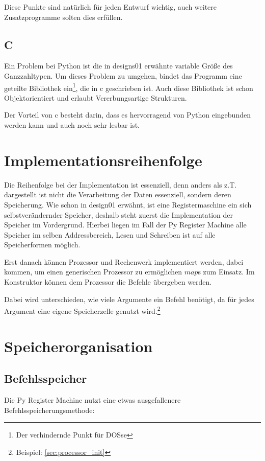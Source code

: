 \documentclass[a4paper,12pt,oneside]{scrreprt}
\begin{document}
Diese Punkte sind natürlich für jeden Entwurf wichtig, auch weitere Zusatzprogramme solten dies erfüllen.

\section{C}

Ein Problem bei Python ist die in designs01 erwähnte variable Größe des Ganzzahltypen. Um dieses Problem zu umgehen, bindet das Programm eine geteilte Bibliothek ein\footnote{Der verhindernde Punkt für DOSse}, die in c geschrieben ist.
Auch diese Bibliothek ist schon Objektorientiert und erlaubt Vererbungsartige Strukturen.

Der Vorteil von c besteht darin, dass es hervorragend von Python eingebunden werden kann und auch noch sehr lesbar ist.

\chapter{Implementationsreihenfolge}

Die Reihenfolge bei der Implementation ist essenziell, denn anders als z.T. dargestellt ist nicht die Verarbeitung der Daten essenziell, sondern deren Speicherung.  
Wie schon in design01 erwähnt, ist eine Registermaschine ein sich selbstverändernder Speicher, deshalb steht zuerst die Implementation der Speicher im Vordergrund.  
Hierbei liegen im Fall der Py Register Machine alle Speicher im selben Addressbereich, Lesen und Schreiben ist auf alle Speicherformen möglich.

Erst danach können Prozessor und Rechenwerk implementiert werden, dabei kommen, um einen generischen Prozessor zu ermöglichen $map$s zum Einsatz. Im Konstruktor können dem Prozessor die Befehle übergeben werden.

Dabei wird unterschieden, wie viele Argumente ein Befehl benötigt, da für jedes Argument eine eigene Speicherzelle genutzt wird.\footnote{Beispiel: \ref{sec:processor_init}}

\chapter{Speicherorganisation}

\section{Befehlsspeicher}

Die Py Register Machine nutzt eine etwas ausgefallenere Befehlsspeicherungsmethode: 
\end{document}
